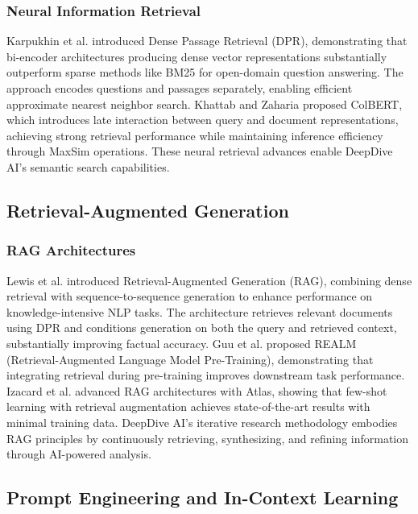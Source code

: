\documentclass[conference]{IEEEtran}
\begin{document}
\subsubsection{Neural Information Retrieval}
Karpukhin et al. \cite{ref3} introduced Dense Passage Retrieval (DPR), demonstrating that bi-encoder architectures producing dense vector representations substantially outperform sparse methods like BM25 for open-domain question answering. The approach encodes questions and passages separately, enabling efficient approximate nearest neighbor search. Khattab and Zaharia \cite{ref24} proposed ColBERT, which introduces late interaction between query and document representations, achieving strong retrieval performance while maintaining inference efficiency through MaxSim operations. These neural retrieval advances enable DeepDive AI's semantic search capabilities.

\subsection{Retrieval-Augmented Generation}

\subsubsection{RAG Architectures}
Lewis et al. \cite{ref25} introduced Retrieval-Augmented Generation (RAG), combining dense retrieval with sequence-to-sequence generation to enhance performance on knowledge-intensive NLP tasks. The architecture retrieves relevant documents using DPR and conditions generation on both the query and retrieved context, substantially improving factual accuracy. Guu et al. \cite{ref26} proposed REALM (Retrieval-Augmented Language Model Pre-Training), demonstrating that integrating retrieval during pre-training improves downstream task performance. Izacard et al. \cite{ref27} advanced RAG architectures with Atlas, showing that few-shot learning with retrieval augmentation achieves state-of-the-art results with minimal training data. DeepDive AI's iterative research methodology embodies RAG principles by continuously retrieving, synthesizing, and refining information through AI-powered analysis.

\subsection{Prompt Engineering and In-Context Learning}
\end{document}

